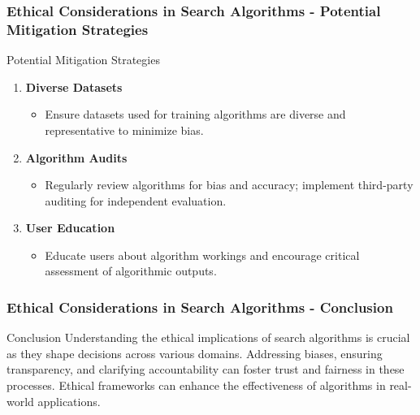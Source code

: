 \documentclass[aspectratio=169]{beamer}
\begin{document}
\begin{frame}[fragile]
    \frametitle{Ethical Considerations in Search Algorithms - Potential Mitigation Strategies}
    \begin{block}{Potential Mitigation Strategies}
        \begin{enumerate}
            \item \textbf{Diverse Datasets}
                \begin{itemize}
                    \item Ensure datasets used for training algorithms are diverse and representative to minimize bias.
                \end{itemize}
                
            \item \textbf{Algorithm Audits}
                \begin{itemize}
                    \item Regularly review algorithms for bias and accuracy; implement third-party auditing for independent evaluation.
                \end{itemize}
                
            \item \textbf{User Education}
                \begin{itemize}
                    \item Educate users about algorithm workings and encourage critical assessment of algorithmic outputs.
                \end{itemize}
        \end{enumerate}
    \end{block}
\end{frame}

\begin{frame}[fragile]
    \frametitle{Ethical Considerations in Search Algorithms - Conclusion}
    \begin{block}{Conclusion}
        Understanding the ethical implications of search algorithms is crucial as they shape decisions across various domains. Addressing biases, ensuring transparency, and clarifying accountability can foster trust and fairness in these processes. Ethical frameworks can enhance the effectiveness of algorithms in real-world applications.
    \end{block}
\end{frame}
\end{document}
